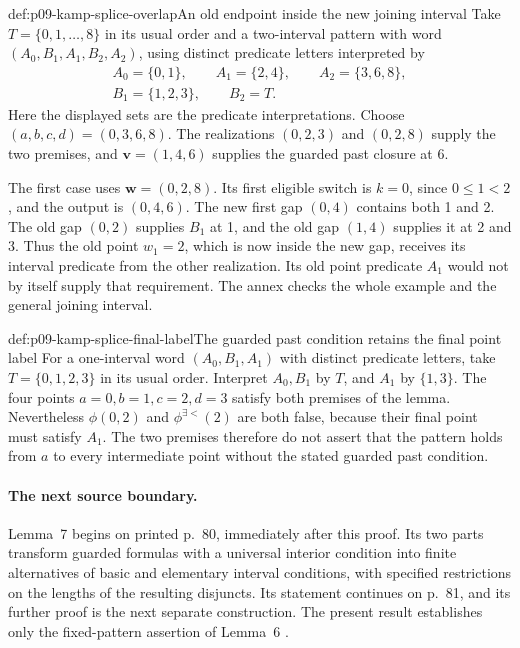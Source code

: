 \begin{hbexample}{def:p09-kamp-splice-overlap}{An old endpoint inside the new joining interval}
Take \(T=\{0,1,\ldots,8\}\) in its usual order and a two-interval
pattern with word \((A_0,B_1,A_1,B_2,A_2)\), using distinct
predicate letters interpreted by
\[
 \begin{gathered}
 A_0=\{0,1\},\qquad A_1=\{2,4\},\qquad A_2=\{3,6,8\},\\
 B_1=\{1,2,3\},\qquad B_2=T.
 \end{gathered}
\]
Here the displayed sets are the predicate interpretations.
Choose \((a,b,c,d)=(0,3,6,8)\).
The realizations \((0,2,3)\) and \((0,2,8)\) supply the two
premises, and \(\mathbf v=(1,4,6)\) supplies the guarded past
closure at 6.

The first case uses \(\mathbf w=(0,2,8)\). Its first eligible
switch is \(k=0\), since \(0\leq1<2\), and the output is
\((0,4,6)\). The new first gap \((0,4)\) contains both 1 and 2.
The old gap \((0,2)\) supplies \(B_1\) at 1, and the old gap
\((1,4)\) supplies it at 2 and 3. Thus the old point \(w_1=2\),
which is now inside the new gap, receives its interval predicate
from the other realization. Its old point predicate \(A_1\)
would not by itself supply that requirement. The annex checks the
whole example and the general joining interval.
\end{hbexample}

\begin{hbexample}{def:p09-kamp-splice-final-label}{The guarded past condition retains the final point label}
For a one-interval word \((A_0,B_1,A_1)\) with distinct predicate letters,
take \(T=\{0,1,2,3\}\) in its usual order. Interpret \(A_0,B_1\)
by \(T\), and \(A_1\) by \(\{1,3\}\).
The four points \(a=0,b=1,c=2,d=3\) satisfy both premises of
the lemma. Nevertheless \(\phi(0,2)\) and
\(\phi^{\exists<}(2)\) are both false, because their final
point must satisfy \(A_1\). The two premises therefore do not
assert that the pattern holds from \(a\) to every intermediate
point without the stated guarded past condition.
\end{hbexample}

\paragraph{The next source boundary.}
Lemma~7 begins on printed p.~80, immediately after this proof.
Its two parts transform guarded formulas with a universal interior
condition into finite alternatives of basic and elementary interval
conditions, with specified restrictions on the lengths of the resulting
disjuncts. Its statement continues on p.~81, and its further proof
is the next separate construction. The present result establishes
only the fixed-pattern assertion of Lemma~6
\cite[ch.~III, pp.~80--81]{Kamp1968}.
